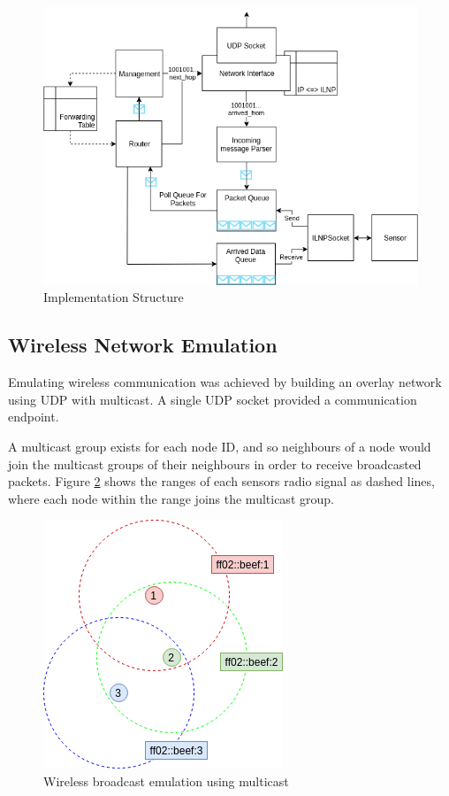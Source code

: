 \documentclass[12pt]{article}
\begin{document}
\begin{figure}[!h]
	\centering
	\includegraphics[width=\linewidth]{images/struc}
	\caption{Implementation Structure}
	\label{fig:struc}
\end{figure}

\subsection{Wireless Network Emulation}

Emulating wireless communication was achieved by building an overlay network using UDP with multicast. A single UDP socket provided a communication endpoint.

A multicast group exists for each node ID, and so neighbours of a node would join the multicast groups of their neighbours in order to receive broadcasted packets. Figure \ref{fig:mcast} shows the ranges of each sensors radio signal as dashed lines, where each node within the range joins the multicast group.

\begin{figure}[!h]
	\centering
	\includegraphics[width=0.5\linewidth]{images/mcast}
	\caption{Wireless broadcast emulation using multicast}
	\label{fig:mcast}
\end{figure}
\end{document}
